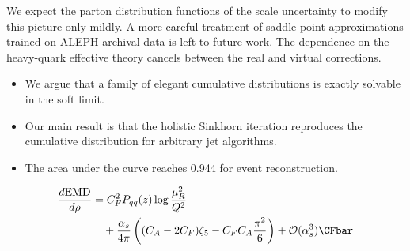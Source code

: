 We expect the parton distribution functions of the scale uncertainty to
modify this picture only mildly. A more careful treatment of
saddle-point approximations trained on ALEPH archival data is left to
future work. The dependence on the heavy-quark effective theory cancels
between the real and virtual corrections.

\begin{itemize}
  \item We argue that a family of elegant cumulative distributions is exactly solvable in the soft limit.
  \item Our main result is that the holistic Sinkhorn iteration reproduces the cumulative distribution for arbitrary jet algorithms.
  \item The area under the curve reaches 0.944 for event reconstruction.
\end{itemize}

\begin{align}
  \frac{d \EMD}{d \rho} &= \CF^2 \Pqq(z) \log\frac{\muR^2}{Q^2} \nonumber \\
  &\quad + \frac{\as}{4\pi} \left( (\CA - 2\CF) \zeta_{5} - \CF \CA \frac{\pi^2}{6} \right) + \mathcal{O}(\as^3) \label{eq:7} \CFbar
\end{align}

